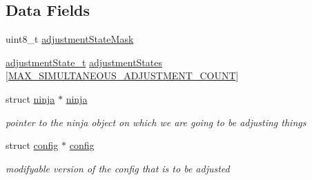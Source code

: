 \subsection*{Data Fields}
\begin{DoxyCompactItemize}
\item 
uint8\+\_\+t \hyperlink{structrc__adj_af323ddc49c950bc0bc5c6b8824348905}{adjustment\+State\+Mask}
\item 
\hyperlink{io_2rc__adjustments_8h_a406d866cecd2ae5072a3b4d5b201cefa}{adjustment\+State\+\_\+t} \hyperlink{structrc__adj_aefc3e31564b873a0173db503b41cbee2}{adjustment\+States} \mbox{[}\hyperlink{test_2unit_2platform_8h_afaa581d04fe426fdb6a46ea281536edd}{M\+A\+X\+\_\+\+S\+I\+M\+U\+L\+T\+A\+N\+E\+O\+U\+S\+\_\+\+A\+D\+J\+U\+S\+T\+M\+E\+N\+T\+\_\+\+C\+O\+U\+N\+T}\mbox{]}
\item 
struct \hyperlink{structninja}{ninja} $\ast$ \hyperlink{structrc__adj_a854aade86258255234829cb9e49c0980}{ninja}
\begin{DoxyCompactList}\small\item\em pointer to the ninja object on which we are going to be adjusting things \end{DoxyCompactList}\item 
struct \hyperlink{structconfig}{config} $\ast$ \hyperlink{structrc__adj_a67490d070d72cb52199910458655f778}{config}
\begin{DoxyCompactList}\small\item\em modifyable version of the config that is to be adjusted \end{DoxyCompactList}\end{DoxyCompactItemize}


